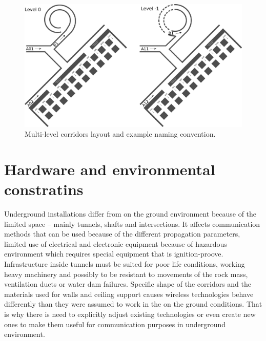 \documentclass[../main.tex]{subfiles}
\begin{document}
\begin{figure}[ht]
\includegraphics[width=\textwidth]{pictures/mine_with_levels_scheme.pdf}
\centering
\caption{Multi-level corridors layout and example naming convention\cite{Thesis_CM}.}
\label{fig:mine_with_levels_scheme}
\end{figure}


\section{Hardware and environmental constratins} %
\label{sub:hardware_and_environmental_constratins}


Underground installations differ from on the ground environment because of the limited space -- mainly tunnels, shafts and intersections. It affects communication methods that can be used because of the different propagation parameters, limited use of electrical and electronic equipment because of hazardous environment which requires special equipment that is ignition-proove. Infrastructure inside tunnels must be suited for poor life conditions, working heavy machinery and possibly to be resistant to movements of the rock mass, ventilation ducts or water dam failures. Specific shape of the corridors and the materials used for walls and ceiling support causes wireless technologies behave differently than they were assumed to work in the on the ground conditions. That is why there is need to explicitly adjust existing technologies or even create new ones to make them useful for communication purposes in underground environment.
\end{document}
